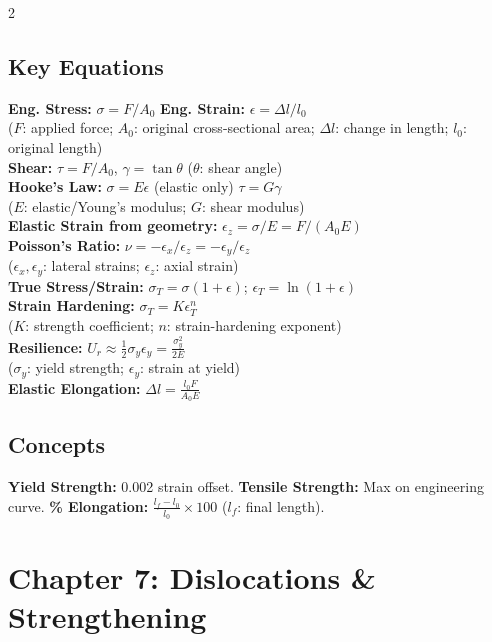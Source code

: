\documentclass[8pt]{extarticle}
\begin{document}
\begin{multicols*}{2}
\subsection*{Key Equations}
\textbf{Eng. Stress:} $\sigma=F/A_0$ \quad \textbf{Eng. Strain:} $\epsilon=\Delta l/l_0$ \\
($F$: applied force; $A_0$: original cross-sectional area; $\Delta l$: change in length; $l_0$: original length) \\
\textbf{Shear:} $\tau=F/A_0$, \; $\gamma=\tan\theta$ \quad ($\theta$: shear angle) \\
\textbf{Hooke's Law:} $\sigma=E\epsilon$ \; (elastic only) \quad $\tau=G\gamma$ \\
($E$: elastic/Young's modulus; $G$: shear modulus) \\
\textbf{Elastic Strain from geometry:} $\epsilon_z = \sigma/E = F/(A_0 E)$ \\
\textbf{Poisson's Ratio:} $\nu=-\epsilon_x/\epsilon_z = -\epsilon_y/\epsilon_z$ \\
($\epsilon_x,\epsilon_y$: lateral strains; $\epsilon_z$: axial strain) \\
\textbf{True Stress/Strain:} $\sigma_T=\sigma(1+\epsilon)$; \; $\epsilon_T=\ln(1+\epsilon)$ \\
\textbf{Strain Hardening:} $\sigma_T=K\epsilon_T^n$ \\
($K$: strength coefficient; $n$: strain-hardening exponent) \\
\textbf{Resilience:} $U_r\approx\frac{1}{2}\sigma_y\epsilon_y=\frac{\sigma_y^2}{2E}$ \\
($\sigma_y$: yield strength; $\epsilon_y$: strain at yield) \\
\textbf{Elastic Elongation:} $\Delta l = \frac{l_0 F}{A_0 E}$
\subsection*{Concepts}
\textbf{Yield Strength:} 0.002 strain offset. \textbf{Tensile Strength:} Max on engineering curve. \textbf{\% Elongation:} $\frac{l_f-l_0}{l_0}\times100$ ($l_f$: final length).

\section*{Chapter 7: Dislocations \& Strengthening}

\end{multicols*}
\end{document}
